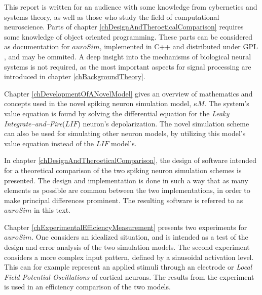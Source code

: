 	This report is written for an audience with some knowledge from cybernetics and systems theory, as well as those who study the field of computational neuroscience.
	Parts of chapter \ref{chDesignAndTheroeticalComparison} requires some knowledge of object oriented programming.
	These parts can be considered as documentation for $auroSim$, implemented in C++ and distributed under GPL\cite{gitRepoCommit} , and may be ommited.
	A deep insight into the mechanisms of biological neural systems is not required, as the most important aspects for signal processing are introduced in chapter \ref{chBackgroundTheory}.

	Chapter \ref{chDevelopmentOfANovelModel} gives an overview of mathematics and concepts used in the novel spiking neuron simulation model, $\kappa M$.
	The system's value equation is found by solving the differential equation for the \emph{Leaky Integrate--and--Fire}($LIF$) neuron's depolarization. 
	The novel simulation scheme can also be used for simulating other neuron models, by utilizing this model's value equation instead of the $LIF$ model's.

	In chapter \ref{chDesignAndTheroeticalComparison}, the design of software intended for a theoretical comparison of the two spiking neuron simulation schemes is presented.
	The design and implementation is done in such a way that as many elements as possible are common between the two implementations, in order to make principal differences prominent.
	The resulting software is referred to as $auroSim$ in this text.


	Chapter \ref{chExperimentalEfficiencyMeasurement} presents two experiments for $auroSim$.
	One considers an idealized situation, and is intended as a test of the design and error analysis of the two simulation models.
	The second experiment considers a more complex input pattern, defined by a sinusoidal activation level.
	This can for example represent an applied stimuli through an electrode or \emph{Local Field Potential Oscillations} of cortical neurons.
	The results from the experiment is used in an efficiency comparison of the two models. %


